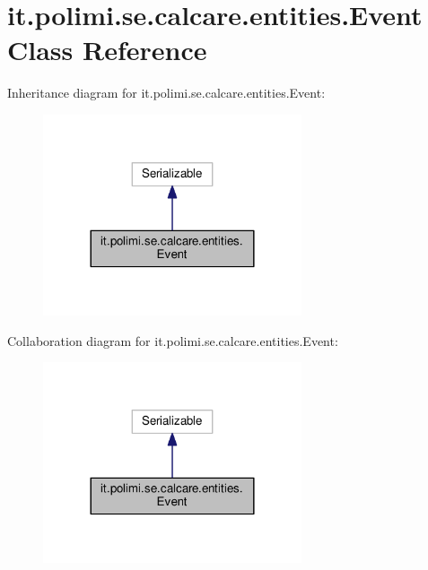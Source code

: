 \hypertarget{classit_1_1polimi_1_1se_1_1calcare_1_1entities_1_1Event}{}\section{it.\+polimi.\+se.\+calcare.\+entities.\+Event Class Reference}
\label{classit_1_1polimi_1_1se_1_1calcare_1_1entities_1_1Event}


Inheritance diagram for it.\+polimi.\+se.\+calcare.\+entities.\+Event\+:
\nopagebreak
\begin{figure}[H]
\begin{center}
\leavevmode
\includegraphics[width=216pt]{classit_1_1polimi_1_1se_1_1calcare_1_1entities_1_1Event__inherit__graph}
\end{center}
\end{figure}


Collaboration diagram for it.\+polimi.\+se.\+calcare.\+entities.\+Event\+:
\nopagebreak
\begin{figure}[H]
\begin{center}
\leavevmode
\includegraphics[width=216pt]{classit_1_1polimi_1_1se_1_1calcare_1_1entities_1_1Event__coll__graph}
\end{center}
\end{figure}
